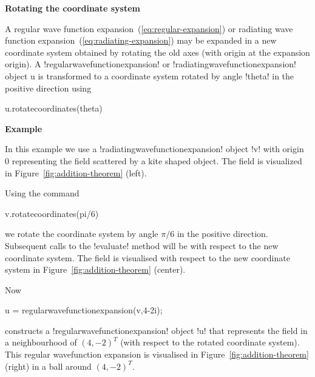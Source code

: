 \documentclass[12pt,letterpaper,final]{article}
\newcommand{\techheading}[1]{%
    \par\vspace{-0.3\parskip}\noindent\hspace{-1cm}\textbf{#1}%
    \par\vspace{-0.5\parskip}\noindent\nopagebreak\ignorespaces}
\begin{document}
\techheading{Rotating the coordinate system}
A regular wave function expansion~(\ref{eq:regular-expansion}) 
or radiating wave function expansion~(\ref{eq:radiating-expansion}) 
may be expanded 
in a new coordinate system obtained by rotating the old
axes (with origin at the expansion origin).
A !regularwavefunctionexpansion! or 
!radiatingwavefunctionexpansion! object u 
is transformed to a coordinate system rotated by angle !theta! in the 
positive direction using
\begin{matlab}
u.rotatecoordinates(theta)
\end{matlab}

\techheading{Example}
In this example
we use a !radiatingwavefunctionexpansion! object !v! with origin 0 
representing
the field scattered by a kite shaped object.
The field is visualized in Figure~\ref{fig:addition-theorem} (left).

Using the command
\begin{matlab}
v.rotatecoordinates(pi/6)
\end{matlab}
we rotate the coordinate system 
by angle $\pi/6$ in the positive direction.
Subsequent calls to the !evaluate! method will be with respect to 
the new coordinate system.
The field is visualised with respect to the
new coordinate system in Figure~\ref{fig:addition-theorem} (center).

Now
\begin{matlab}
u = regularwavefunctionexpansion(v,4-2i);
\end{matlab}
constructs a !regularwavefunctionexpansion! object !u! 
that represents the field in a neighbourhood of $(4,-2)^T$
(with respect to the rotated coordinate system).
This regular wavefunction expansion is visualised
in Figure~\ref{fig:addition-theorem} (right)
in a ball around $(4,-2)^T$.
\end{document}
